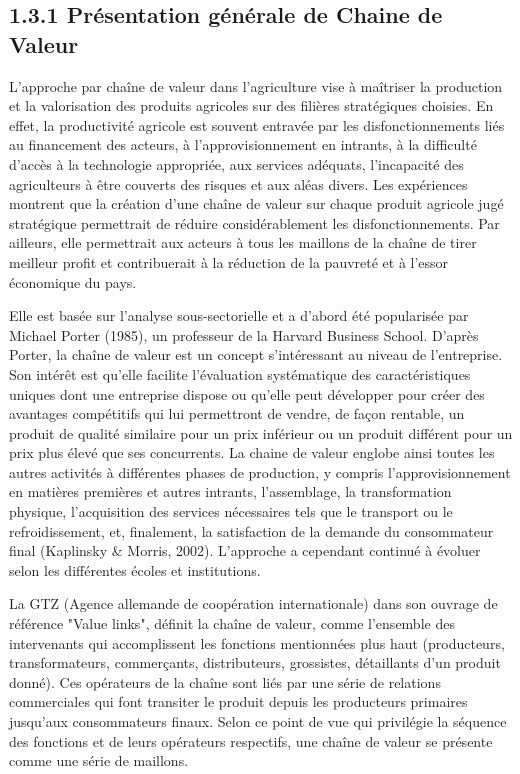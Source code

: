 \documentclass[12pt,oneside]{report}
\begin{document}
\subsection{1.3.1 Présentation générale de Chaine de Valeur}
L’approche par chaîne de valeur dans l’agriculture vise à maîtriser la production et la valorisation des produits agricoles sur des filières stratégiques choisies. En effet, la productivité agricole est souvent entravée par les disfonctionnements liés au financement des acteurs, à l’approvisionnement en intrants, à la difficulté d’accès à la technologie appropriée, aux services adéquats, l’incapacité des agriculteurs à être couverts des risques et aux aléas divers. Les expériences montrent que la création d’une chaîne de valeur sur chaque produit agricole jugé stratégique permettrait de réduire considérablement les disfonctionnements. Par ailleurs, elle permettrait aux acteurs à tous les maillons de la chaîne de tirer meilleur profit et contribuerait à la réduction de la pauvreté et à l’essor économique du pays.

Elle est basée sur l'analyse sous-sectorielle et a d'abord été popularisée par Michael Porter (1985), un professeur de la Harvard Business School. D’après Porter, la chaîne de valeur est un concept s’intéressant au niveau de l’entreprise. Son intérêt est qu’elle facilite l’évaluation systématique des caractéristiques uniques dont une entreprise dispose ou qu’elle peut développer pour créer des avantages compétitifs qui lui permettront de vendre, de façon rentable, un produit de qualité similaire pour un prix inférieur ou un produit différent pour un prix plus élevé que ses concurrents. La chaine de valeur englobe ainsi toutes les autres activités à différentes phases de production, y compris l'approvisionnement en matières premières et autres intrants, l'assemblage, la transformation physique, l'acquisition des services nécessaires tels que le transport ou le refroidissement, et, finalement, la satisfaction de la demande du consommateur final (Kaplinsky \& Morris, 2002). L'approche a cependant continué à évoluer selon les différentes écoles et institutions.

La GTZ (Agence allemande de coopération internationale) dans son ouvrage de référence "Value links", définit la chaîne de valeur, comme l'ensemble des intervenants qui accomplissent les fonctions mentionnées plus haut (producteurs, transformateurs, commerçants, distributeurs, grossistes, détaillants d'un produit donné). Ces opérateurs de la chaîne sont liés par une série de relations commerciales qui font transiter le produit depuis les producteurs primaires jusqu'aux consommateurs finaux. Selon ce point de vue qui privilégie la séquence des fonctions et de leurs opérateurs respectifs, une chaîne de valeur se présente comme une série de maillons.
\end{document}
